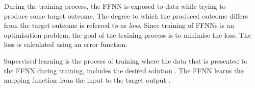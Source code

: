 During the training process, the \acs{FFNN} is exposed to data while trying to produce some target outcome. The degree to which the produced outcome differs from the target outcome is referred to as \textit{loss}. Since training of \acp{FFNN} is an optimisation problem, the goal of the training process is to minimise the loss. The loss is calculated using an error function.

Supervised learning is the process of training where the data that is presented to the \acs{FFNN} during training, includes the desired solution \cite{ref:geron:2017}. The \acs{FFNN} learns the mapping function from the input to the target output \cite{ref:brownlee:2016}.
